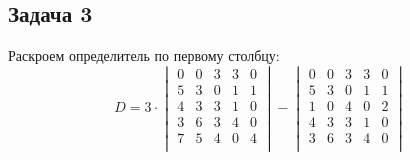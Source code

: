 	   \subsection{Задача 3}
	   Раскроем определитель по первому столбцу:
	   \[
	   D = 3 \cdot
	   \begin{vmatrix}
	   0 & 0 & 3 & 3 & 0 \\
	   5 & 3 & 0 & 1 & 1 \\
	   4 & 3 & 3 & 1 & 0 \\
	   3 & 6 & 3 & 4 & 0 \\
	   7 & 5 & 4 & 0 & 4 \\
	   \end{vmatrix} 
	   -
	   \begin{vmatrix}
	   0 & 0 & 3 & 3 & 0 \\
	   5 & 3 & 0 & 1 & 1 \\
	   1 & 0 & 4 & 0 & 2 \\
	   4 & 3 & 3 & 1 & 0 \\
	   3 & 6 & 3 & 4 & 0 \\
	   \end{vmatrix}
	   \]
	    
